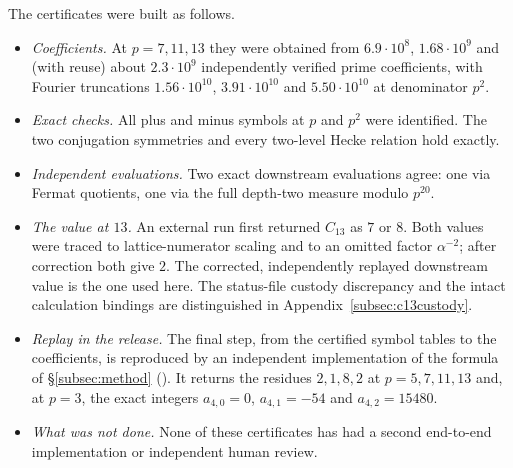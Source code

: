 \begin{remark}[Certificates]\label{rem:smallcert}
The certificates were built as follows.
\begin{itemize}[leftmargin=*]
\item \emph{Coefficients.} At $p=7,11,13$ they were obtained from $6.9\cdot10^{8}$, $1.68\cdot10^{9}$ and (with reuse) about $2.3\cdot10^{9}$ independently verified prime coefficients, with Fourier truncations $1.56\cdot10^{10}$, $3.91\cdot10^{10}$ and $5.50\cdot10^{10}$ at denominator $p^2$.
\item \emph{Exact checks.} All plus and minus symbols at $p$ and $p^2$ were identified. The two conjugation symmetries and every two-level Hecke relation hold exactly.
\item \emph{Independent evaluations.} Two exact downstream evaluations agree: one via Fermat quotients, one via the full depth-two measure modulo $p^{20}$.
\item \emph{The value at $13$.} An external run first returned $C_{13}$ as $7$ or $8$. Both values were traced to lattice-numerator scaling and to an omitted factor $\alpha^{-2}$; after correction both give $2$. The corrected, independently replayed downstream value is the one used here. The status-file custody discrepancy and the intact calculation bindings are distinguished in Appendix~\ref{subsec:c13custody}.
\item \emph{Replay in the release.} The final step, from the certified symbol tables to the coefficients, is reproduced by an independent implementation of the formula of \S\ref{subsec:method} (). It returns the residues $2,1,8,2$ at $p=5,7,11,13$ and, at $p=3$, the exact integers $a_{4,0}=0$, $a_{4,1}=-54$ and $a_{4,2}=15480$.
\item \emph{What was not done.} None of these certificates has had a second end-to-end implementation or independent human review.
\end{itemize}
\end{remark}

